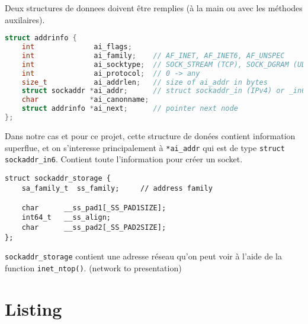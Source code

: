 \documentclass[11pt,a4paper]{article}
\begin{document}
Deux structures de donnees doivent être remplies (à la main ou avec
les méthodes auxilaires).

\begin{lstlisting}[language=c]
struct addrinfo {
    int              ai_flags;
    int              ai_family;    // AF_INET, AF_INET6, AF_UNSPEC
    int              ai_socktype;  // SOCK_STREAM (TCP), SOCK_DGRAM (UDP)
    int              ai_protocol;  // 0 -> any
    size_t           ai_addrlen;   // size of ai_addr in bytes
    struct sockaddr *ai_addr;      // struct sockaddr_in (IPv4) or _in6
    char            *ai_canonname;
    struct addrinfo *ai_next;      // pointer next node
};
\end{lstlisting}

Dans notre cas et pour ce projet, cette structure de donées contient
information superflue, et on s'interesse principalement à
\texttt{*ai\_addr} qui est de type \texttt{struct
  sockaddr\_in6}. Contient toute l'information pour créer un socket.


\begin{lstlisting}
struct sockaddr_storage {
    sa_family_t  ss_family;     // address family

    char      __ss_pad1[_SS_PAD1SIZE];
    int64_t   __ss_align;
    char      __ss_pad2[_SS_PAD2SIZE];
};
\end{lstlisting}
\texttt{sockaddr\_storage} contient une adresse réseau qu'on peut voir
à l'aide de la function \texttt{inet\_ntop()}. (network to presentation)

\newpage

\section{Listing}


\newpage

\newpage

\end{document}
